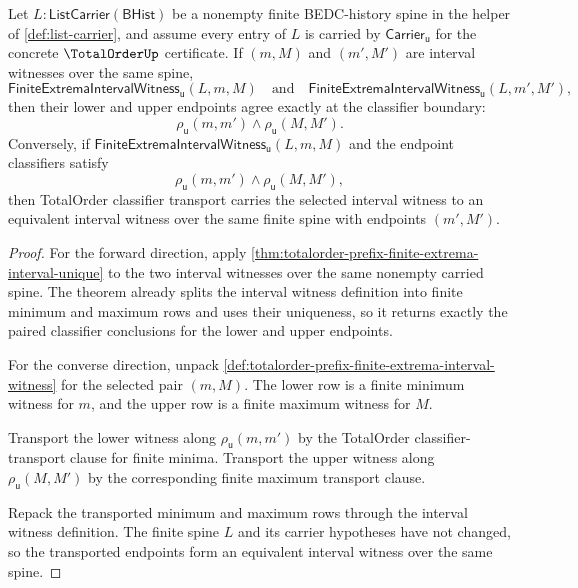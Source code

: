 \begin{theorem}
\label{thm:totalorder-finite-extrema-interval-endpoint-exactness}
Let $L:\mathsf{ListCarrier}(\mathsf{BHist})$ be a nonempty finite BEDC-history
spine in the helper of \autoref{def:list-carrier}, and assume every entry of
$L$ is carried by $\mathsf{Carrier}_{\mathsf{u}}$ for the concrete
$\TotalOrderUp$ certificate. If $(m,M)$ and $(m',M')$ are interval witnesses
over the same spine,
$$
\mathsf{FiniteExtremaIntervalWitness}_{\mathsf{u}}(L,m,M)
\quad\text{and}\quad
\mathsf{FiniteExtremaIntervalWitness}_{\mathsf{u}}(L,m',M'),
$$
then their lower and upper endpoints agree exactly at the classifier boundary:
$$
\rho_{\mathsf{u}}(m,m')
\land
\rho_{\mathsf{u}}(M,M').
$$
Conversely, if $\mathsf{FiniteExtremaIntervalWitness}_{\mathsf{u}}(L,m,M)$ and
the endpoint classifiers satisfy
$$
\rho_{\mathsf{u}}(m,m')
\land
\rho_{\mathsf{u}}(M,M'),
$$
then TotalOrder classifier transport carries the selected interval witness to
an equivalent interval witness over the same finite spine with endpoints
$(m',M')$.
\end{theorem}
\begin{proof}
For the forward direction, apply
\autoref{thm:totalorder-prefix-finite-extrema-interval-unique} to the two
interval witnesses over the same nonempty carried spine. The theorem already
splits the interval witness definition into finite minimum and maximum rows and
uses their uniqueness, so it returns exactly the paired classifier conclusions
for the lower and upper endpoints.

For the converse direction, unpack
\autoref{def:totalorder-prefix-finite-extrema-interval-witness} for the selected
pair $(m,M)$. The lower row is a finite minimum witness for $m$, and the upper
row is a finite maximum witness for $M$.

Transport the lower witness along $\rho_{\mathsf{u}}(m,m')$ by the
TotalOrder classifier-transport clause for finite minima. Transport the upper
witness along $\rho_{\mathsf{u}}(M,M')$ by the corresponding finite maximum
transport clause.

Repack the transported minimum and maximum rows through the interval witness
definition. The finite spine $L$ and its carrier hypotheses have not changed,
so the transported endpoints form an equivalent interval witness over the same
spine.
\end{proof}

